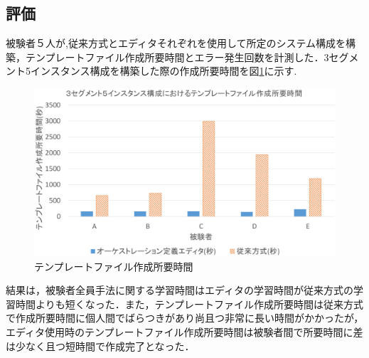 \documentclass[a4j]{jarticle}
\begin{document}
\begin{Abstract}
 \section{評価}
 被験者５人が,従来方式とエディタそれぞれを使用して所定のシステム構成を構築，テンプレートファイル作成所要時間とエラー発生回数を計測した．3セグメント5インスタンス構成を構築した際の作成所要時間を図\ref{graf:2}に示す.
 \begin{figure}[H]
 	\begin{center}
 		\vspace{-4mm}
 		\includegraphics[scale=0.265]{Document/Abstract_Comparison.eps}
 		\caption{テンプレートファイル作成所要時間}
 		\label{graf:2}
 	\end{center}
 \end{figure}
 \vspace{-8mm}
 結果は，被験者全員手法に関する学習時間はエディタの学習時間が従来方式の学習時間よりも短くなった．また，テンプレートファイル作成所要時間は従来方式で作成所要時間に個人間でばらつきがあり尚且つ非常に長い時間がかかったが，エディタ使用時のテンプレートファイル作成所要時間は被験者間で所要時間に差は少なく且つ短時間で作成完了となった．
 

\end{Abstract}
\end{document}
